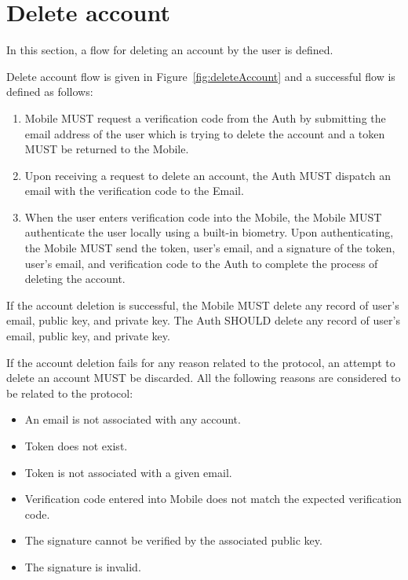 \section{Delete account}
In this section, a flow for deleting an account by the user is defined. 
\medskip

Delete account flow is given in Figure~\ref{fig:deleteAccount} and a successful flow is defined as follows:
    \begin{enumerate}
        \item Mobile MUST request a verification code from the Auth by submitting the email address of the user
              which is trying to delete the account and a token MUST be returned to the Mobile.
        \item Upon receiving a request to delete an account, the Auth MUST dispatch an email with the verification
              code to the Email.
        \item When the user enters verification code into the Mobile, the Mobile MUST authenticate the user locally 
              using a built-in biometry. Upon authenticating, the Mobile MUST send the token, user's email, and a 
              signature of the token, user's email, and verification code to the Auth to complete the process of 
              deleting the account.
    \end{enumerate}
    
If the account deletion is successful, the Mobile MUST delete any record of user's email, public key, and 
private key. The Auth SHOULD delete any record of user's email, public key, and private key.
\medskip

If the account deletion fails for any reason related to the protocol, an attempt to delete an account MUST be 
discarded. All the following reasons are considered to be related to the protocol:
    \begin{itemize}
        \item An email is not associated with any account.
        \item Token does not exist.
        \item Token is not associated with a given email.
        \item Verification code entered into Mobile does not match the expected verification code.
        \item The signature cannot be verified by the associated public key.
        \item The signature is invalid.
    \end{itemize}
